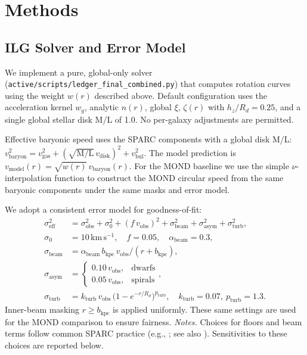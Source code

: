 \documentclass[12pt,a4paper]{article}
\begin{document}
\section{Methods}

\subsection{ILG Solver and Error Model}

We implement a pure, global-only solver (\texttt{active/scripts/ledger\_final\_combined.py}) that computes rotation curves using the weight $w(r)$ described above. Default configuration uses the acceleration kernel $w_g$, analytic $n(r)$, global $\xi$, $\zeta(r)$ with $h_z/R_d=0.25$, and a single global stellar disk M/L of 1.0. No per-galaxy adjustments are permitted.

Effective baryonic speed uses the SPARC components with a global disk M/L: $v_\mathrm{baryon}^2 = v_\mathrm{gas}^2 + (\sqrt{\mathrm{M/L}}\,v_\mathrm{disk})^2 + v_\mathrm{bul}^2$. The model prediction is $v_\mathrm{model}(r) = \sqrt{w(r)}\, v_\mathrm{baryon}(r)$.
For the MOND baseline we use the simple $\nu$-interpolation function to construct the MOND circular speed from the same baryonic components under the same masks and error model.

We adopt a consistent error model for goodness-of-fit:
\begin{align}
\sigma_\mathrm{eff}^2 &= \sigma_\mathrm{obs}^2 + \sigma_0^2 + (f\,v_\mathrm{obs})^2 + \sigma_\mathrm{beam}^2 + \sigma_\mathrm{asym}^2 + \sigma_\mathrm{turb}^2,\\
\sigma_0 &= 10\,\mathrm{km\,s^{-1}},\quad f = 0.05,\quad \alpha_\mathrm{beam}=0.3,\\
\sigma_\mathrm{beam} &= \alpha_\mathrm{beam}\, b_\mathrm{kpc}\, v_\mathrm{obs}/(r+b_\mathrm{kpc}),\\
\sigma_\mathrm{asym} &= \begin{cases}0.10\,v_\mathrm{obs}, & \text{dwarfs}\\ 0.05\,v_\mathrm{obs}, & \text{spirals}\end{cases},\\
\sigma_\mathrm{turb} &= k_\mathrm{turb}\, v_\mathrm{obs}\,\big(1-e^{-r/R_d}\big)^{p_\mathrm{turb}},\quad k_\mathrm{turb}=0.07,\ p_\mathrm{turb}=1.3.
\end{align}
Inner-beam masking $r\ge b_\mathrm{kpc}$ is applied uniformly. These same settings are used for the MOND comparison to ensure fairness.
\noindent\textit{Notes.} Choices for floors and beam terms follow common SPARC practice (e.g., \citealp{lelli2016sparc}; see also \citealp{mcgaugh2016}). Sensitivities to these choices are reported below.
\end{document}
